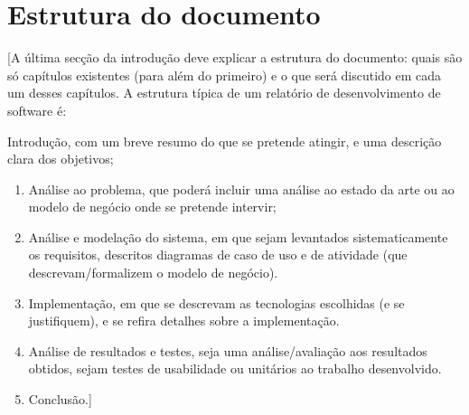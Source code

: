 \section{Estrutura do documento}
 [A última secção da introdução deve explicar a estrutura do documento: quais são só capítulos existentes (para além do primeiro) e o que será discutido em cada um desses capítulos. A estrutura típica de um relatório de desenvolvimento de software é: 

 Introdução, com um breve resumo do que se pretende atingir, e uma descrição clara dos objetivos;

\begin{enumerate}
    \item Análise ao problema, que poderá incluir uma análise ao estado da arte ou ao modelo de negócio onde se pretende intervir;
    \item Análise e modelação do sistema, em que sejam levantados sistematicamente os requisitos, descritos diagramas de caso de uso e de atividade (que descrevam/formalizem o modelo de negócio). 
    \item Implementação, em que se descrevam as tecnologias escolhidas (e se justifiquem), e se refira detalhes sobre a implementação.
    \item Análise de resultados e testes, seja uma análise/avaliação aos resultados obtidos, sejam testes de usabilidade ou unitários ao trabalho desenvolvido. 
    \item Conclusão.]
\end{enumerate}{}
